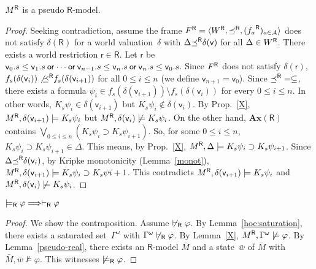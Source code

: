   \begin{lemma}
   ${M}^{\mathsf R}$ is a pseudo $\mathsf R$-model.
  \end{lemma}
  \begin{proof}
   Seeking contradiction,
   assume the frame ${F}^{\mathsf R} = \langle{{W}^{\mathsf R}, {\preceq}^{\mathsf R}, ({f_a}^{\mathsf R})_{a\in\mathcal A}}\rangle$
   does not satisfy $\delta(\mathsf R)$ for
   a world valuation~$\delta$ with
   $\Delta{\preceq}^{\mathsf R}\delta(\mathsf v)$ for all $\Delta\in{W}^{\mathsf R}$.
   There exists a world restriction
   $\mathsf r\in\mathsf R$.
   Let $\mathsf r$ be $\mathsf v_0.s\le\mathsf v_1.s\mathbin{\mathsf{or}}\cdots \mathbin{\mathsf{or}}\mathsf
   v_{n-1}.s\le\mathsf v_n.s\mathbin{\mathsf{or}}\mathsf v_n.s\le\mathsf v_0.s$.
   Since ${F}^{\mathsf R}$ does not satisfy $\delta(\mathsf r)$,
   $f_s(\delta(\mathsf v_i))\not{{\preceq}^{\mathsf R}}f_s(\delta(\mathsf v_{i+1}))$
   for
   all $0\le i\le n$ (we define $\mathsf v_{n+1} = \mathsf v_0$).
   Since ${\preceq}^{\mathsf R} = \subseteq$, there exists
   a formula $\psi_i\in f_s(\delta(\mathsf v_{i+1}))\setminus
   f_s(\delta(\mathsf v_i))$ for every $0\le i\le n$.
   In other words, $K_s\psi_i\in\delta(\mathsf v_{i+1})$
   but $K_s\psi_i\notin\delta(\mathsf v_i)$.
   By Prop.~\ref{X},
   ${M}^{\mathsf R},\delta(\mathsf v_{i+1})\models K_s\psi_i$ but
   ${M}^{\mathsf R},\delta(\mathsf v_{i})\not\models K_s\psi_i$.
   On the other hand, $\mathbf{Ax}(\mathsf R)$ contains
   $\bigvee_{0\le i\le n}\left(K_s\psi_i\supset K_s\psi_{i+1}\right)$.
   So, for some $0\le i\le n$,
   $K_s\psi_i\supset K_s\psi_{i+1}\in\Delta$.
   This means, by Prop.~\ref{X},
   ${M}^{\mathsf R},\Delta\models K_s\psi_i\supset K_s\psi_{i+1}$.
   Since $\Delta{\preceq}^{\mathsf R}\delta(\mathsf v_i)$,
   by Kripke monotonicity (Lemma~\ref{monot}),
   ${M}^{\mathsf R},\delta(\mathsf v_{i+1})\models K_s\psi_i\supset K_s\psi{i+1}$.
   This contradicts ${M}^{\mathsf R},\delta(\mathsf v_{i+1})\models K_s\psi_i$ and
   ${M}^{\mathsf R},\delta(\mathsf v_i)\not\models K_s\psi_i$.
  \end{proof}

  \begin{lemma}[Completeness]
   $\models_{\mathsf R}\varphi\Longrightarrow\vdash_{\mathsf R}\varphi$
  \end{lemma}
  \begin{proof}
   We show the contraposition.
   Assume $\not\vdash_{\mathsf R} \varphi$. By
   Lemma~\ref{hoe:saturation}, there exists
   a saturated set~$\Gamma^\omega$ with $\Gamma^\omega\not\vdash_{\mathsf R}\varphi$.
   By Lemma~\ref{X}, ${M}^{\mathsf R}, \Gamma^\omega\not\models\varphi$.
   By Lemma~\ref{pseudo-real}, there exists an
   $\mathsf R$-model $\bar M$ and a state~$\bar w$ of $\bar M$
   with $\bar M,\bar w\not\models \varphi$.
   This witnesses $\not\models_{\mathsf R}\varphi$.
  \end{proof}


